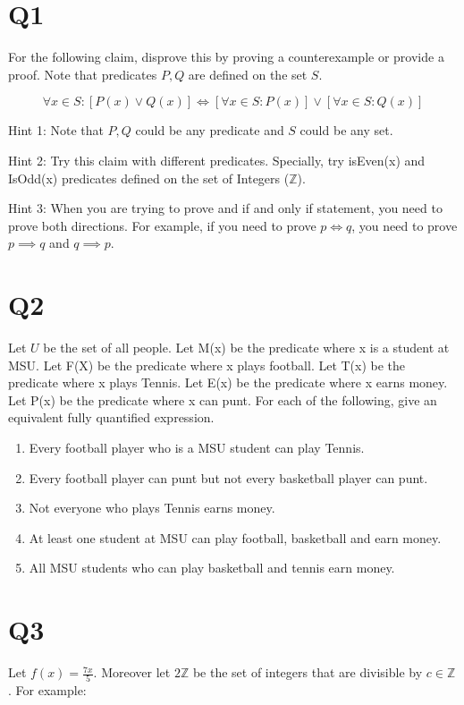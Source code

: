 \documentclass[12pt]{exam}
\begin{document}
\section{Q1}
For the following claim, disprove this by proving a counterexample or provide a proof. Note that predicates $P,Q$ are defined on the set $S$. 

\[\forall x \in S : [ P(x) \vee Q(x) ] \iff [\forall x \in S : P(x)] \vee [\forall x \in S : Q(x)]\]

Hint 1: Note that $P, Q$ could be any predicate and $S$ could be any set. 

Hint 2: Try this claim with different predicates. Specially, try isEven(x) and IsOdd(x) predicates defined on the set of Integers ($\mathds{Z}$).

Hint 3: When you are trying to prove and if and only if statement, you need to prove both directions. For example, if you need to prove $p \iff q$, you need to prove $p \implies q$ and $q \implies p$. 


\section{Q2} 
Let $U$ be the set of all people. Let M(x) be the predicate where x is a student at MSU. Let F(X) be the predicate where x plays football. Let T(x) be the predicate where x plays Tennis. Let E(x) be the predicate where x earns money. Let P(x) be the predicate where x can punt. For each of the following, give an equivalent fully quantified expression. 

\begin{enumerate}
    \item Every football player who is a MSU student can play Tennis. 
    \item Every football player can punt but not every basketball player can punt. 
    \item Not everyone who plays Tennis earns money.
    \item At least one student at MSU can play football, basketball and earn money.
    \item All MSU students who can play basketball and tennis earn money.
\end{enumerate}


\section{Q3}
Let $f(x) = \frac{7x}{5}$. Moreover let $2\mathds{Z}$ be the set of integers that are divisible by $c \in \mathds{Z}$. For example:
\end{document}
